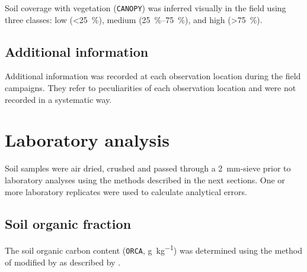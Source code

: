 Soil coverage with vegetation (\texttt{CANOPY}) was inferred visually in the field using three classes: 
low (\SI{<25}{\percent}), medium (\SIrange{25}{75}{\percent}), and high (\SI{>75}{\percent}).

\tocless\subsection{Additional information}

Additional information was recorded at each observation location during the field campaigns. They refer to 
peculiarities of each observation location and were not recorded in a systematic way.

\tocless\section{Laboratory analysis}

Soil samples were air dried, crushed and passed through a \SI{2}{\milli\metre}-sieve prior to laboratory 
analyses using the methods described in the next sections. One or more laboratory replicates were used to 
calculate analytical errors.

\tocless\subsection{Soil organic fraction}

The soil organic carbon content (\texttt{ORCA}, \si{\gram\per\kilo\gram}) was determined using the method of
 modified by  as described by
.

